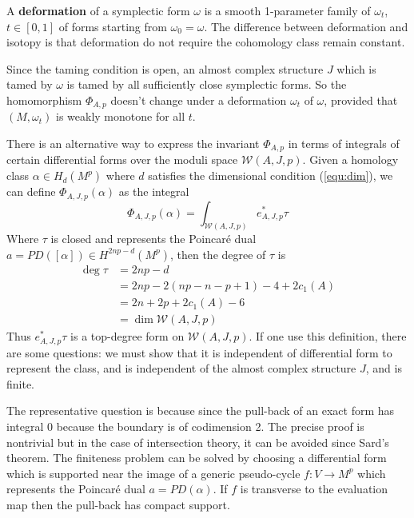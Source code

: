\documentclass[twoside]{article}
\begin{document}
A \textbf{deformation} of a symplectic form $\omega$ is 
a smooth 1-parameter family of $\omega_t$,  $t\in[0,1]$ of forms starting from $\omega_0=\omega$. 
The difference between deformation and isotopy is that 
deformation do not require the cohomology class remain constant.

Since the taming condition is open, an almost complex structure $J$ 
which is tamed by $\omega$ is tamed by all sufficiently close symplectic forms. 
So the homomorphism $\Phi_{A,p}$ doesn't change under a deformation $\omega_t$ of $\omega$, 
provided that $(M,\omega_t)$ is weakly monotone for all $t$.

\begin{remark}
    There is an alternative way to express the invariant $\Phi_{A,p}$ in terms of 
    integrals of certain differential forms over the moduli space $\mathscr{W}(A,J,p)$. 
    Given a homology class $\alpha\in H_d(M^p)$ where $d$ satisfies the dimensional condition (\ref{equ:dim}), 
    we can define $\Phi_{A,J,p}(\alpha)$ as the integral
    \[\Phi_{A,J,p}(\alpha)=\int_{\mathscr{W}(A,J,p)}e_{A,J,p}^*\tau\]
    Where $\tau$ is closed and represents the Poincar\'e dual $a=PD([\alpha])\in H^{2np-d}(M^p)$, 
    then the degree of $\tau$ is
    \[ \begin{aligned}
        \deg \tau &=2np-d \\
        &=2np-2(np-n-p+1)-4+2c_1(A)\\
        &=2n+2p+2c_1(A)-6 \\
        &=\dim\mathscr{W}(A,J,p)
    \end{aligned} \]
    Thus $e_{A,J,p}^*\tau$ is a top-degree form on $\mathscr{W}(A,J,p)$. 
    If one use this definition, there are some questions: 
    we must show that it is independent of differential form to represent the class, 
    and is independent of the almost complex structure $J$, and is finite.

    The representative question is because since 
    the pull-back of an exact form has integral 0 because the boundary is of codimension 2.
    The precise proof is nontrivial but in the case of intersection theory, 
    it can be avoided since Sard's theorem. 
    The finiteness problem can be solved by choosing a differential form 
    which is supported near the image of a generic pseudo-cycle $f\colon V\rightarrow M^p$ 
    which represents the Poincar\'e dual $a=PD(\alpha)$. 
    If $f$ is transverse to the evaluation map then the pull-back has compact support.
\end{remark}
\end{document}
